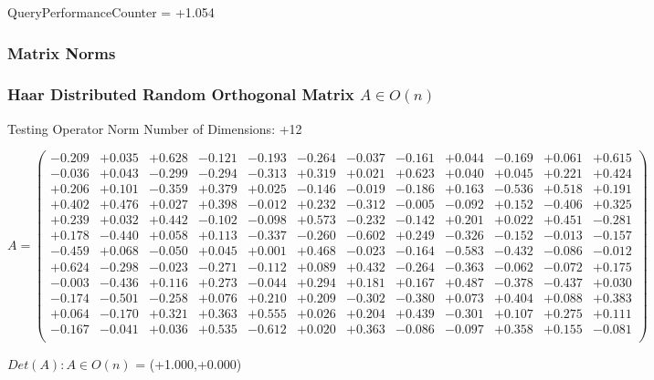\documentclass[9pt]{article}
\theoremstyle{plain}
\theoremstyle{definition}
\theoremstyle{remark}
\numberwithin{equation}{section}
\begin{document}
QueryPerformanceCounter  =  +1.054
\subsubsection{Matrix Norms}
\subsubsection{Haar Distributed Random Orthogonal Matrix $A \in O(n)$}
 Testing Operator Norm
Number of Dimensions: +12

$A = \left(
\begin{array}{
cccccccccccc}
-0.209 & +0.035 & +0.628 & -0.121 & -0.193 & -0.264 & -0.037 & -0.161 & +0.044 & -0.169 & +0.061 & +0.615 \\
-0.036 & +0.043 & -0.299 & -0.294 & -0.313 & +0.319 & +0.021 & +0.623 & +0.040 & +0.045 & +0.221 & +0.424 \\
+0.206 & +0.101 & -0.359 & +0.379 & +0.025 & -0.146 & -0.019 & -0.186 & +0.163 & -0.536 & +0.518 & +0.191 \\
+0.402 & +0.476 & +0.027 & +0.398 & -0.012 & +0.232 & -0.312 & -0.005 & -0.092 & +0.152 & -0.406 & +0.325 \\
+0.239 & +0.032 & +0.442 & -0.102 & -0.098 & +0.573 & -0.232 & -0.142 & +0.201 & +0.022 & +0.451 & -0.281 \\
+0.178 & -0.440 & +0.058 & +0.113 & -0.337 & -0.260 & -0.602 & +0.249 & -0.326 & -0.152 & -0.013 & -0.157 \\
-0.459 & +0.068 & -0.050 & +0.045 & +0.001 & +0.468 & -0.023 & -0.164 & -0.583 & -0.432 & -0.086 & -0.012 \\
+0.624 & -0.298 & -0.023 & -0.271 & -0.112 & +0.089 & +0.432 & -0.264 & -0.363 & -0.062 & -0.072 & +0.175 \\
-0.003 & -0.436 & +0.116 & +0.273 & -0.044 & +0.294 & +0.181 & +0.167 & +0.487 & -0.378 & -0.437 & +0.030 \\
-0.174 & -0.501 & -0.258 & +0.076 & +0.210 & +0.209 & -0.302 & -0.380 & +0.073 & +0.404 & +0.088 & +0.383 \\
+0.064 & -0.170 & +0.321 & +0.363 & +0.555 & +0.026 & +0.204 & +0.439 & -0.301 & +0.107 & +0.275 & +0.111 \\
-0.167 & -0.041 & +0.036 & +0.535 & -0.612 & +0.020 & +0.363 & -0.086 & -0.097 & +0.358 & +0.155 & -0.081 \\
\end{array}
\right)$ \newline 

$Det(A) :   A \in O(n)$ = (+1.000,+0.000)
\end{document}
